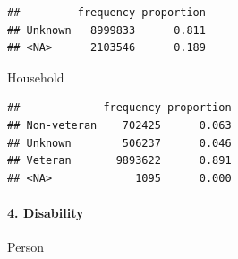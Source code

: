 \documentclass[
]{article}
\newenvironment{Shaded}{\begin{snugshade}}{\end{snugshade}}
\newcommand{\AttributeTok}[1]{\textcolor[rgb]{0.13,0.29,0.53}{#1}}
\newcommand{\CommentTok}[1]{\textcolor[rgb]{0.56,0.35,0.01}{\textit{#1}}}
\newcommand{\ConstantTok}[1]{\textcolor[rgb]{0.56,0.35,0.01}{#1}}
\newcommand{\DecValTok}[1]{\textcolor[rgb]{0.00,0.00,0.81}{#1}}
\newcommand{\FunctionTok}[1]{\textcolor[rgb]{0.13,0.29,0.53}{\textbf{#1}}}
\newcommand{\NormalTok}[1]{#1}
\newcommand{\OtherTok}[1]{\textcolor[rgb]{0.56,0.35,0.01}{#1}}
\newcommand{\SpecialCharTok}[1]{\textcolor[rgb]{0.81,0.36,0.00}{\textbf{#1}}}
\newcommand{\StringTok}[1]{\textcolor[rgb]{0.31,0.60,0.02}{#1}}
\begin{document}
\begin{verbatim}
##         frequency proportion
## Unknown   8999833      0.811
## <NA>      2103546      0.189
\end{verbatim}

Household

\begin{Shaded}
\end{Shaded}

\begin{verbatim}
##             frequency proportion
## Non-veteran    702425      0.063
## Unknown        506237      0.046
## Veteran       9893622      0.891
## <NA>             1095      0.000
\end{verbatim}

\paragraph{4. Disability}\label{disability}

Person
\end{document}

